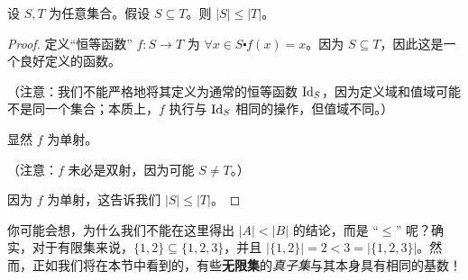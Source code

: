 \begin{lemma}\label{lemma7.6.11}
    设 $S, T$ 为任意集合。假设 $S \subseteq T$。则 $|S| \le |T|$。
\end{lemma}

\begin{proof}
    定义``恒等函数'' $f : S \to T$ 为 $\forall x \in S \centerdot f(x) = x$。因为 $S \subseteq T$，因此这是一个良好定义的函数。

    （注意：我们不能严格地将其定义为通常的恒等函数 $\text{Id}_S$，因为定义域和值域可能不是同一个集合；本质上，$f$ 执行与 $\text{Id}_S$ 相同的操作，但值域不同。）

    显然 $f$ 为单射。

    （注意：$f$ 未必是双射，因为可能 $S \ne T$。）

    因为 $f$ 为单射，这告诉我们 $|S| \le |T|$。
\end{proof}

你可能会想，为什么我们不能在这里得出 $|A| < |B|$ 的结论，而是 ``$\le$'' 呢？确实，对于有限集来说，$\{1, 2\} \subseteq \{1, 2, 3\}$，并且 $|\{1, 2\}| = 2 < 3 = |\{1, 2, 3\}|$。然而，正如我们将在本节中看到的，有些\textbf{无限集}的\emph{真子集}与其本身具有相同的基数！\\

